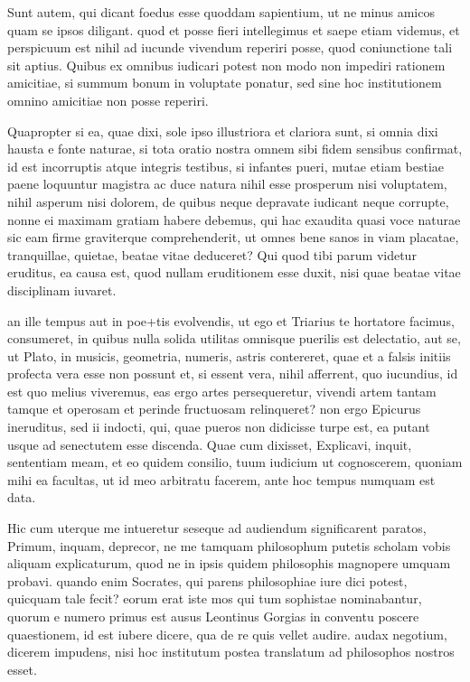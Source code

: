  Sunt autem, qui dicant foedus esse quoddam sapientium, ut ne minus amicos quam se ipsos diligant. quod et posse fieri intellegimus et saepe etiam videmus, et perspicuum est nihil ad iucunde vivendum reperiri posse, quod coniunctione tali sit aptius. Quibus ex omnibus iudicari potest non modo non impediri rationem amicitiae, si summum bonum in voluptate ponatur, sed sine hoc institutionem omnino amicitiae non posse reperiri.

 Quapropter si ea, quae dixi, sole ipso illustriora et clariora sunt, si omnia dixi hausta e fonte naturae, si tota oratio nostra omnem sibi fidem sensibus confirmat, id est incorruptis atque integris testibus, si infantes pueri, mutae etiam bestiae paene loquuntur magistra ac duce natura nihil esse prosperum nisi voluptatem, nihil asperum nisi dolorem, de quibus neque depravate iudicant neque corrupte, nonne ei maximam gratiam habere debemus, qui hac exaudita quasi voce naturae sic eam firme graviterque comprehenderit, ut omnes bene sanos in viam placatae, tranquillae, quietae, beatae vitae deduceret? Qui quod tibi parum videtur eruditus, ea causa est, quod nullam eruditionem esse duxit, nisi quae beatae vitae disciplinam iuvaret.

 an ille tempus aut in poe+tis evolvendis, ut ego et Triarius te hortatore facimus, consumeret, in quibus nulla solida utilitas omnisque puerilis est delectatio, aut se, ut Plato, in musicis, geometria, numeris, astris contereret, quae et a falsis initiis profecta vera esse non possunt et, si essent vera, nihil afferrent, quo iucundius, id est quo melius viveremus, eas ergo artes persequeretur, vivendi artem tantam tamque et operosam et perinde fructuosam relinqueret? non ergo Epicurus ineruditus, sed ii indocti, qui, quae pueros non didicisse turpe est, ea putant usque ad senectutem esse discenda. Quae cum dixisset, Explicavi, inquit, sententiam meam, et eo quidem consilio, tuum iudicium ut cognoscerem, quoniam mihi ea facultas, ut id meo arbitratu facerem, ante hoc tempus numquam est data.

 Hic cum uterque me intueretur seseque ad audiendum significarent paratos, Primum, inquam, deprecor, ne me tamquam philosophum putetis scholam vobis aliquam explicaturum, quod ne in ipsis quidem philosophis magnopere umquam probavi. quando enim Socrates, qui parens philosophiae iure dici potest, quicquam tale fecit? eorum erat iste mos qui tum sophistae nominabantur, quorum e numero primus est ausus Leontinus Gorgias in conventu poscere quaestionem, id est iubere dicere, qua de re quis vellet audire. audax negotium, dicerem impudens, nisi hoc institutum postea translatum ad philosophos nostros esset.


